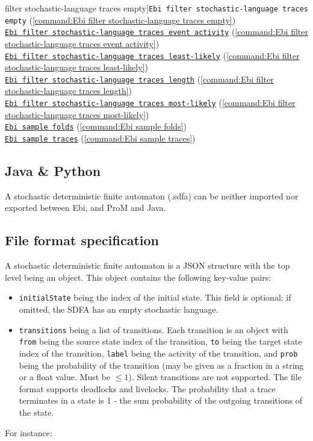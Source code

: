 {filter stochastic-language traces empty]{\texttt{Ebi filter stochastic-language traces empty}} (\cref{command:Ebi filter stochastic-language traces empty})\\\null\qquad\hyperref[command:Ebi filter stochastic-language traces event activity]{\texttt{Ebi filter stochastic-language traces event activity}} (\cref{command:Ebi filter stochastic-language traces event activity})\\\null\qquad\hyperref[command:Ebi filter stochastic-language traces least-likely]{\texttt{Ebi filter stochastic-language traces least-likely}} (\cref{command:Ebi filter stochastic-language traces least-likely})\\\null\qquad\hyperref[command:Ebi filter stochastic-language traces length]{\texttt{Ebi filter stochastic-language traces length}} (\cref{command:Ebi filter stochastic-language traces length})\\\null\qquad\hyperref[command:Ebi filter stochastic-language traces most-likely]{\texttt{Ebi filter stochastic-language traces most-likely}} (\cref{command:Ebi filter stochastic-language traces most-likely})\\\null\qquad\hyperref[command:Ebi sample folds]{\texttt{Ebi sample folds}} (\cref{command:Ebi sample folds})\\\null\qquad\hyperref[command:Ebi sample traces]{\texttt{Ebi sample traces}} (\cref{command:Ebi sample traces})
\subsection*{Java \& Python}
A stochastic deterministic finite automaton (.sdfa) can be neither imported nor exported between Ebi, and ProM and Java.
\subsection*{File format specification}A stochastic deterministic finite automaton is a JSON structure with the top level being an object.
    This object contains the following key-value pairs:
    \begin{itemize}
    \item \texttt{initialState} being the index of the initial state. This field is optional: if omitted, the SDFA has an empty stochastic language.
    \item \texttt{transitions} being a list of transitions. 
    Each transition is an object with \texttt{from} being the source state index of the transition, 
    \texttt{to} being the target state index of the transition, 
    \texttt{label} being the activity of the transition, and
    \texttt{prob} being the probability of the transition (may be given as a fraction in a string or a float value. Must be $\leq 1$). 
    Silent transitions are not supported.
    The file format supports deadlocks and livelocks.
    The probability that a trace terminates in a state is 1 - the sum probability of the outgoing transitions of the state.
    \end{itemize}
    For instance:
    
    
}

